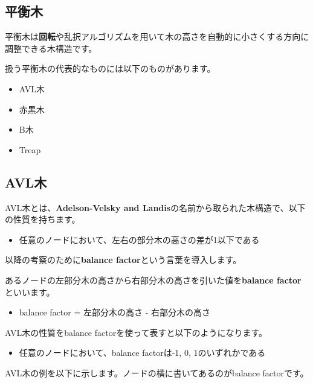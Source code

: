 \documentclass{jlreq}
\begin{document}
\vspace{0.5cm}

\subsection{平衡木}
平衡木は\textbf{回転}や乱択アルゴリズムを用いて木の高さを自動的に小さくする方向に調整できる木構造です。

扱う平衡木の代表的なものには以下のものがあります。

\begin{itemize}
  \item AVL木
  \item 赤黒木
  \item B木
  \item Treap
\end{itemize}

\subsection{AVL木}
AVL木とは、\textbf{Adelson-Velsky and Landis}の名前から取られた木構造で、以下の性質を持ちます。

\begin{itemize}
  \item 任意のノードにおいて、左右の部分木の高さの差が1以下である
\end{itemize}

\vspace{0.5cm}

以降の考察のために\textbf{balance factor}という言葉を導入します。

\begin{definitionbox}
  あるノードの左部分木の高さから右部分木の高さを引いた値を\textbf{balance factor}といいます。
  \begin{itemize}
    \item balance factor = 左部分木の高さ - 右部分木の高さ
  \end{itemize}
\end{definitionbox}

AVL木の性質をbalance factorを使って表すと以下のようになります。

\begin{itemize}
  \item 任意のノードにおいて、balance factorは-1, 0, 1のいずれかである
\end{itemize}

AVL木の例を以下に示します。ノードの横に書いてあるのがbalance factorです。
\end{document}
